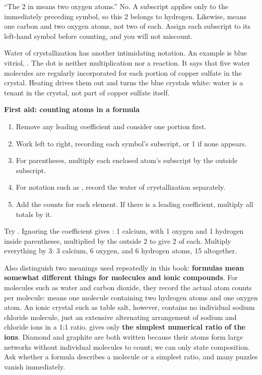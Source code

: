 \begin{wuqu}
``The 2 in  means two oxygen atoms.'' No. A subscript applies only to the immediately preceding symbol, so this 2 belongs to hydrogen. Likewise,  means one carbon and two oxygen atoms, not two of each. Assign each subscript to its left-hand symbol before counting, and you will not miscount.
\end{wuqu}

Water of crystallization has another intimidating notation. An example is blue vitriol, . The dot is neither multiplication nor a reaction. It says that five water molecules are regularly incorporated for each portion of copper sulfate in the crystal. Heating drives them out and turns the blue crystals white: water is a tenant in the crystal, not part of copper sulfate itself.

\textbf{First aid: counting atoms in a formula}

\begin{enumerate}[itemsep=2pt]
\item Remove any leading coefficient and consider one portion first.
\item Work left to right, recording each symbol's subscript, or 1 if none appears.
\item For parentheses, multiply each enclosed atom's subscript by the outside subscript.
\item For notation such as , record the water of crystallization separately.
\item Add the counts for each element. If there is a leading coefficient, multiply all totals by it.
\end{enumerate}

Try . Ignoring the coefficient gives : 1 calcium, with 1 oxygen and 1 hydrogen inside parentheses, multiplied by the outside 2 to give 2 of each. Multiply everything by 3: 3 calcium, 6 oxygen, and 6 hydrogen atoms, 15 altogether.

Also distinguish two meanings used repeatedly in this book: \textbf{formulas mean somewhat different things for molecules and ionic compounds}. For molecules such as water and carbon dioxide, they record the actual atom counts per molecule:  means one molecule containing two hydrogen atoms and one oxygen atom. An ionic crystal such as table salt, however, contains no individual sodium chloride molecule, just an extensive alternating arrangement of sodium and chloride ions in a 1:1 ratio.  gives only \textbf{the simplest numerical ratio of the ions}. Diamond and graphite are both written  because their atoms form large networks without individual molecules to count; we can only state composition. Ask whether a formula describes a molecule or a simplest ratio, and many puzzles vanish immediately.

